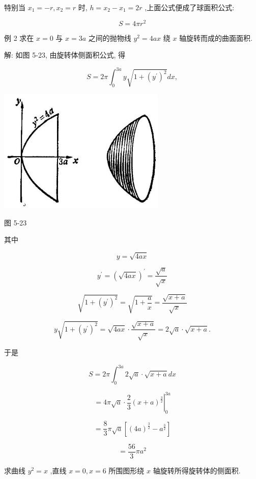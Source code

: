 \documentclass[lang=cn,newtx,10pt,scheme=chinese]{elegantbook}
\begin{document}
特别当 \({x}_{1} = - r,{x}_{2} = r\) 时, \(h = {x}_{2} - {x}_{1} = {2r}\) ,上面公式便成了球面积公式:

\[
S = {4\pi }{r}^{2}
\]

例 2 求在 \(x = 0\) 与 \(x = {3a}\) 之间的抛物线 \({y}^{2} = {4ax}\) 绕 \(x\) 轴旋转而成的曲面面积.

解: 如图 5-23, 由旋转体侧面积公式, 得

\[
S = {2\pi }{\int }_{0}^{3a}y\sqrt{1 + {\left( {y}^{\prime }\right) }^{2}}{dx},
\]

\begin{center}
\includegraphics[max width=0.6\textwidth]{images/01912c18-5c3f-733d-b775-749ba9897a9d_247_426094.jpg}
\end{center}

图 5-23

其中

\[
y = \sqrt{4ax}
\]

\[
{y}^{\prime } = {\left( \sqrt{4ax}\right) }^{\prime } = \frac{\sqrt{a}}{\sqrt{x}}
\]

\[
\sqrt{1 + {\left( {y}^{\prime }\right) }^{2}} = \sqrt{1 + \frac{a}{x}} = \frac{\sqrt{x + a}}{\sqrt{x}}
\]

\[
y\sqrt{1 + {\left( {y}^{\prime }\right) }^{2}} = \sqrt{4ax} \cdot \frac{\sqrt{x + a}}{\sqrt{x}} = 2\sqrt{a} \cdot \sqrt{x + a}.
\]

于是

\[
S = {2\pi }{\int }_{0}^{3a}2\sqrt{a} \cdot \sqrt{x + a}{dx}
\]

\[
= {\left. 4\pi \sqrt{a} \cdot \frac{2}{3}{\left( x + a\right) }^{\frac{3}{2}}\right| }_{0}^{3a}
\]

\[
= \frac{8}{3}\pi \sqrt{a}\left\lbrack {{\left( 4a\right) }^{\frac{3}{2}} - {a}^{\frac{3}{2}}}\right\rbrack
\]

\[
= \frac{56}{3}\pi {a}^{2}
\]

\begin{problemset}[练习]

\item 求曲线 \({y}^{2} = x\) ,直线 \(x = 0,x = 6\) 所围图形绕 \(x\) 轴旋转所得旋转体的侧面积.

\end{problemset}
\end{document}
